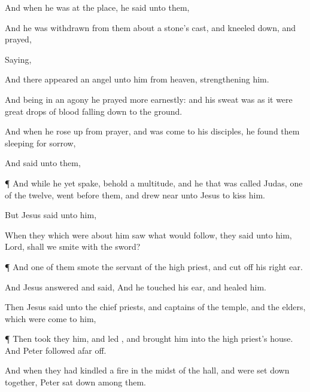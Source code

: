 {And when he
was
at the
place, he
said unto
them,
{}

And
he was
withdrawn
from
them
about a
stone’s
cast,
and
kneeled
down, and
prayed,

Saying,
{}

And there
appeared an
angel unto
him
from
heaven,
strengthening
him.

And
being
in an
agony he
prayed more
earnestly:
and
his
sweat
was as it
were great
drops of
blood falling
down
to the
ground.

And when he rose
up
from
prayer, and was
come
to his
disciples, he
found
them
sleeping
for
sorrow,

And
said unto
them,
{}


\par }{\PP {}¶
And while
he
yet
spake,
behold a
multitude,
and he
that was
called
Judas,
one of the
twelve, went
before
them,
and drew
near unto
Jesus to
kiss
him.

But
Jesus
said unto
him,
{}

When they which
were
about
him
saw what would
follow, they
said unto
him,
Lord,
shall we
smite
with the
sword?


\par }{\PP {}¶
And
one
of
them
smote the
servant of the high
priest,
and cut
off
his
right
ear.

And
Jesus
answered and
said,
{}
And he
touched
his
ear, and
healed
him.

Then
Jesus
said
unto the chief
priests,
and
captains of the
temple,
and the
elders,
which were
come
to
him,
{}



\par }{\PP {}¶
Then took
they
him, and
led
{},
and
brought
him
into the high
priest’s
house.
And
Peter
followed afar
off.

And when they had
kindled a
fire
in the
midst of the
hall,
and were set down
together,
Peter sat
down
among
them.

}
